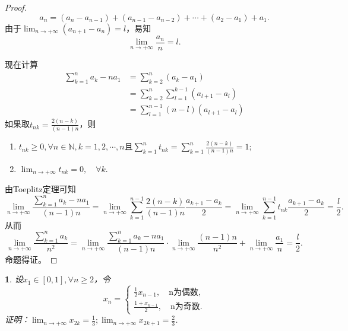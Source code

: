 \documentclass[utf8]{book}
\newtheorem{example}{}[section]             %
\begin{document}
\begin{proof}
$$a_n = (a_n - a_{n-1}) + (a_{n-1}-a_{n-2})+\cdots + (a_2 - a_1) + a_1.$$
由于$\displaystyle\lim_{n\to +\infty}(a_{n+1}-a_n) = l$，易知
$$\displaystyle\lim_{n\to +\infty}\frac{a_n}{n} = l.$$

现在计算
\begin{equation*}
\begin{split}
\displaystyle\sum_{k=1}^na_k - na_1 &= \displaystyle\sum_{k=2}^{n}(a_k - a_1)\\
&=\displaystyle\sum_{k=2}^{n}\displaystyle\sum_{l=1}^{k-1}(a_{l+1}-a_l)\\
&=\displaystyle\sum_{l=1}^{n-1}(n-l)(a_{l+1}-a_l)
\end{split}
\end{equation*}
如果取$t_{nk}=\displaystyle\frac{2(n-k)}{(n-1)n}$，则
\renewcommand\labelenumi{\normalfont(\theenumi)}
\begin{enumerate}
\item $t_{nk} \geq 0, \forall n\in\mathbb{N}, k=1,2,\cdots, n$且$\displaystyle\sum_{k=1}^{n}t_{nk} = \displaystyle\sum_{k=1}^{n}\frac{2(n-k)}{(n-1)n}=1$;
\item $\displaystyle\lim_{n\to +\infty}t_{nk} = 0, \quad\forall k$.
\end{enumerate}
由Toeplitz定理可知
$$\displaystyle\lim_{n\to +\infty}\frac{\displaystyle\sum_{k=1}^na_k - na_1}{(n-1)n}=\displaystyle\lim_{n\to +\infty}\displaystyle\sum_{k=1}^{n-1}\frac{2(n-k)}{(n-1)n}\frac{a_{k+1}-a_k}{2}=\displaystyle\lim_{n\to +\infty}\displaystyle\sum_{k=1}^{n-1}t_{nk}\frac{a_{k+1}-a_k}{2}=\frac{l}{2}.$$
从而
$$\displaystyle\lim_{n\to +\infty}\frac{\displaystyle\sum_{k=1}^na_k}{n^2}=\displaystyle\lim_{n\to +\infty}\frac{\displaystyle\sum_{k=1}^na_k - na_1}{(n-1)n}\cdot\displaystyle\lim_{n\to +\infty}\frac{(n-1)n}{n^2}+\displaystyle\lim_{n\to +\infty}\frac{a_1}{n}=\frac{l}{2}.$$
命题得证。
\end{proof}
\begin{example}
设$x_1\in[0,1], \forall n\geq 2$，令
\begin{equation*}
x_n =
\begin{cases}
\frac{1}{2}x_{n-1}, \quad \text{n为偶数,}\\
\frac{1+x_{n-1}}{2},\quad\text{n为奇数.}
\end{cases}
\end{equation*}
证明：$\displaystyle\lim_{n\to +\infty}x_{2k}=\frac{1}{3};\displaystyle\lim_{n\to +\infty}x_{2k+1}=\frac{2}{3}$.
\end{example}
\end{document}

